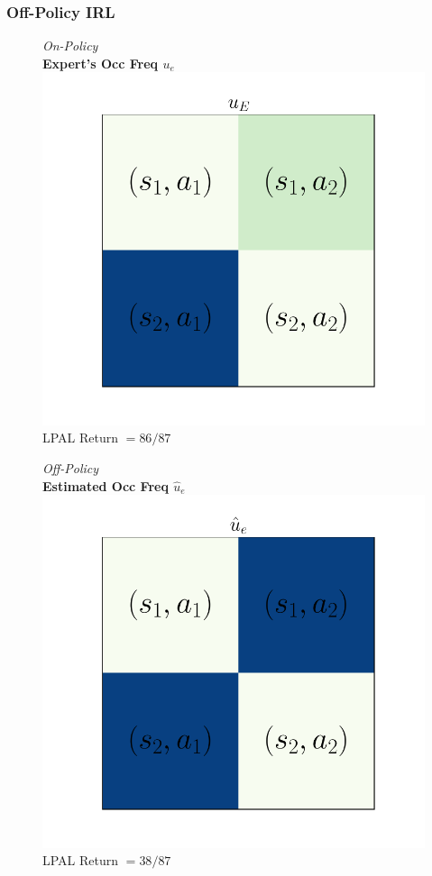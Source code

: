 \documentclass{beamer}
\begin{document}
\begin{frame}
\frametitle{Off-Policy IRL}
\begin{figure}
  \begin{center}
  \begin{minipage}{0.45\linewidth}
    \centering
    \emph{On-Policy}\\
    \textbf{Expert's Occ Freq $u_e$}
    \includegraphics[width=\linewidth]{./plots/all_state/ue.pdf}
    LPAL Return $= 86/87$
  \end{minipage}
  \begin{minipage}{0.45\linewidth}
    \centering
    \emph{Off-Policy}\\
    \textbf{Estimated Occ Freq $\hat{u}_e$}
    \includegraphics[width=\linewidth]{./plots/all_state/uehat.pdf}
    LPAL Return $= 38/87$
  \end{minipage}
  \end{center}
\end{figure}
\end{frame}
\end{document}
